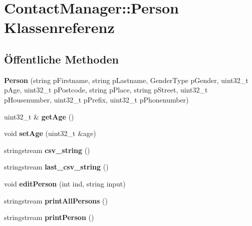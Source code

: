 \hypertarget{classContactManager_1_1Person}{}\section{Contact\+Manager\+:\+:Person Klassenreferenz}
\label{classContactManager_1_1Person}
\subsection*{Öffentliche Methoden}
\begin{DoxyCompactItemize}
\item 
\mbox{\label{classContactManager_1_1Person_ab1082b4e670d792fa0e7089a1834f2a2}} 
{\bfseries Person} (string p\+Firstname, string p\+Lastname, Gender\+Type p\+Gender, uint32\+\_\+t p\+Age, uint32\+\_\+t p\+Postcode, string p\+Place, string p\+Street, uint32\+\_\+t p\+Housenumber, uint32\+\_\+t p\+Prefix, uint32\+\_\+t p\+Phonenumber)
\item 
\mbox{\label{classContactManager_1_1Person_a785d2a902e5fb396adf21e3a69718edd}} 
uint32\+\_\+t \& {\bfseries get\+Age} ()
\item 
\mbox{\label{classContactManager_1_1Person_a298a88f301dca88c65df8cfdeeccfef7}} 
void {\bfseries set\+Age} (uint32\+\_\+t \&age)
\item 
\mbox{\label{classContactManager_1_1Person_a3bc1692664e68de81b431caa6a77510b}} 
stringstream {\bfseries csv\+\_\+string} ()
\item 
\mbox{\label{classContactManager_1_1Person_a02082ab6323515784c739db351daf44c}} 
stringstream {\bfseries last\+\_\+csv\+\_\+string} ()
\item 
\mbox{\label{classContactManager_1_1Person_a90d0e64d4db9d19843a343c6f9564555}} 
void {\bfseries edit\+Person} (int ind, string input)
\item 
\mbox{\label{classContactManager_1_1Person_a781616d2e1b0ebe4601b3914d4a03bc3}} 
stringstream {\bfseries print\+All\+Persons} ()
\item 
\mbox{\label{classContactManager_1_1Person_ab1be17c0aac5d094a6fd94d9e1fa7ed4}} 
stringstream {\bfseries print\+Person} ()
\end{DoxyCompactItemize}
